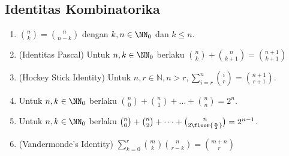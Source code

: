 \subsection{Identitas Kombinatorika}
\begin{enumerate}
    \item  ${n \choose k} = {n \choose n-k}$ dengan $k,n \in \NN_0$ dan $k \le n$.
    \item (Identitas Pascal) Untuk $n,k \in \NN_0$ berlaku ${n \choose k} + {n \choose k+1} = {n+1 \choose k+1}$
    \item (Hockey Stick Identity) Untuk $n,r\in\mathbb{N}, n>r,\sum^n_{i=r}{i\choose r}={n+1\choose r+1}$.
    \item Untuk $n,k \in \NN_0$ berlaku ${n \choose 0}+{n \choose 1} + \dots + {n \choose n} = 2^{n}$.
    \item Untuk $n,k \in \NN_0$ berlaku ${n \choose 0}+{n \choose 2} + \dots + {n \choose 2\floor{\frac{n}{2}}} = 2^{n-1}$.
    \item (Vandermonde's Identity)  $\sum_{k=0}^r\binom mk\binom n{r-k}=\binom{m+n}r$
\end{enumerate}

